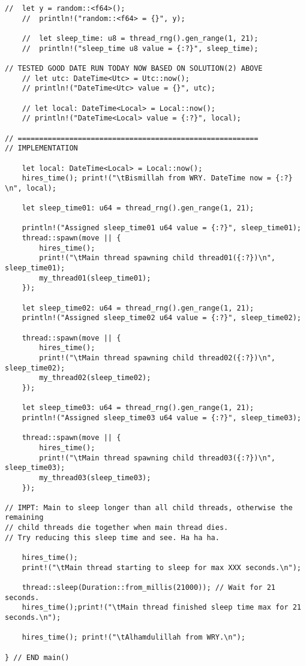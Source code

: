 \begin{lstlisting}[caption={App4-Rust Parallel Multithreading Codes}, label=App4-Rust Parallel Multithreading Codes]
	//  let y = random::<f64>();
	//  println!("random::<f64> = {}", y);
	
	//  let sleep_time: u8 = thread_rng().gen_range(1, 21);
	//  println!("sleep_time u8 value = {:?}", sleep_time); 

// TESTED GOOD DATE RUN TODAY NOW BASED ON SOLUTION(2) ABOVE
	// let utc: DateTime<Utc> = Utc::now();       
	// println!("DateTime<Utc> value = {}", utc);
	
	// let local: DateTime<Local> = Local::now(); 
	// println!("DateTime<Local> value = {:?}", local);

// ========================================================
// IMPLEMENTATION

	let local: DateTime<Local> = Local::now();
	hires_time(); print!("\tBismillah from WRY. DateTime now = {:?} \n", local);
	
	let sleep_time01: u64 = thread_rng().gen_range(1, 21);
	
	println!("Assigned sleep_time01 u64 value = {:?}", sleep_time01);
	thread::spawn(move || {
		hires_time();
		print!("\tMain thread spawning child thread01({:?})\n", sleep_time01);
		my_thread01(sleep_time01);
	});
	
	let sleep_time02: u64 = thread_rng().gen_range(1, 21);
	println!("Assigned sleep_time02 u64 value = {:?}", sleep_time02);

	thread::spawn(move || {
		hires_time(); 
		print!("\tMain thread spawning child thread02({:?})\n", sleep_time02);
		my_thread02(sleep_time02);
	});

	let sleep_time03: u64 = thread_rng().gen_range(1, 21);
	println!("Assigned sleep_time03 u64 value = {:?}", sleep_time03);

	thread::spawn(move || {
		hires_time(); 
		print!("\tMain thread spawning child thread03({:?})\n", sleep_time03);
		my_thread03(sleep_time03);
	});

// IMPT: Main to sleep longer than all child threads, otherwise the remaining
// child threads die together when main thread dies.
// Try reducing this sleep time and see. Ha ha ha.

	hires_time();
	print!("\tMain thread starting to sleep for max XXX seconds.\n");

	thread::sleep(Duration::from_millis(21000)); // Wait for 21 seconds.
	hires_time();print!("\tMain thread finished sleep time max for 21 seconds.\n");

	hires_time(); print!("\tAlhamdulillah from WRY.\n");
	
} // END main()


\end{lstlisting}
